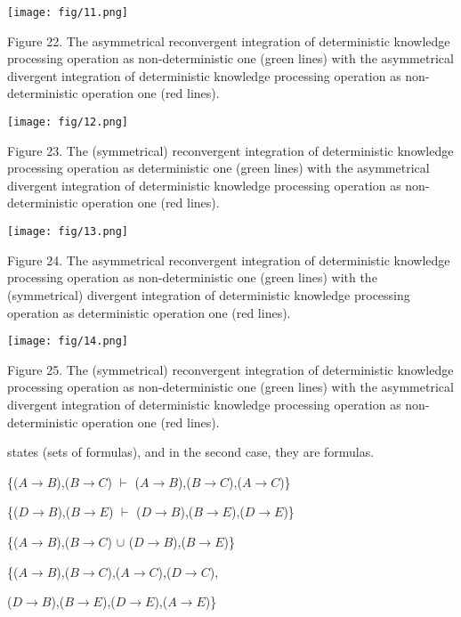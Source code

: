 \documentclass{article}
\begin{document}
\begin{multicols}{2}
\begin{center}
\texttt{[image: fig/11.png]}
\end{center}
\vspace{0.5pt}
\scriptsize Figure 22. The asymmetrical reconvergent integration of deterministic
knowledge processing operation as non-deterministic one (green lines)
with the asymmetrical divergent integration of deterministic knowledge
processing operation as non-deterministic operation one (red lines).


\begin{center}
\texttt{[image: fig/12.png]}
\end{center}
\vspace{0.5pt}
\scriptsize Figure 23. The (symmetrical) reconvergent integration of deterministic
knowledge processing operation as deterministic one (green lines)
with the asymmetrical divergent integration of deterministic knowledge
processing operation as non-deterministic operation one (red lines).

\begin{center}
\texttt{[image: fig/13.png]}
\end{center}
\vspace{0.5pt}
\scriptsize Figure 24. The asymmetrical reconvergent integration of deterministic
knowledge processing operation as non-deterministic one (green lines)
with the (symmetrical) divergent integration of deterministic knowledge
processing operation as deterministic operation one (red lines).


\begin{center}
\texttt{[image: fig/14.png]}
\end{center}
\vspace{0.5pt}
\scriptsize Figure 25. The (symmetrical) reconvergent integration of deterministic
knowledge processing operation as non-deterministic one (green lines)
with the asymmetrical divergent integration of deterministic knowledge
processing operation as non-deterministic operation one (red lines).

\normalsize

states (sets of formulas), and in the second case, they are
formulas.

\vspace{10pt}
 
\centerline{\{($A \rightarrow B$),($B \rightarrow C$) $\vdash$ ($A \rightarrow B$),($B \rightarrow C$),($A \rightarrow C$)\}}
\centerline{\{($D \rightarrow B$),($B \rightarrow E$) $\vdash$ ($D \rightarrow B$),($B \rightarrow E$),($D \rightarrow E$)\}} 
\centerline{\{($A \rightarrow B$),($B \rightarrow C$) $\cup$ ($D \rightarrow B$),($B \rightarrow E$)\}} 
\centerline{\{($A \rightarrow B$),($B \rightarrow C$),($A \rightarrow C$),($D \rightarrow C$),} 
\centerline{($D \rightarrow B$),($B \rightarrow E$),($D \rightarrow E$),($A \rightarrow E$)\}}


\end{multicols}
\end{document}
